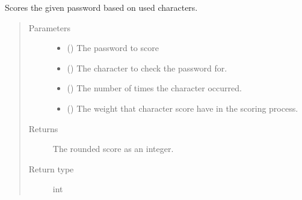 \documentclass[letterpaper,10pt,english]{sphinxmanual}
\begin{document}
\begin{fulllineitems}
\begin{fulllineitems}
\end{fulllineitems}


\begin{fulllineitems}
\label{\detokenize{EntroPass:EntroPass.pwd_score.Pwd_score.score_pwd_chars}}
\sphinxAtStartPar
Scores the given password based on used characters.
\begin{quote}\begin{description}
\item[{Parameters}] \leavevmode\begin{itemize}
\item {} 
\sphinxAtStartPar
{} () \textendash{} The password to score

\item {} 
\sphinxAtStartPar
{} () \textendash{} The character to check the password for.

\item {} 
\sphinxAtStartPar
{} () \textendash{} The number of times the character occurred.

\item {} 
\sphinxAtStartPar
{} (\sphinxstyleliteralemphasis{\sphinxupquote{, }}) \textendash{} The weight that character score have in the scoring process.

\end{itemize}

\item[{Returns}] \leavevmode
\sphinxAtStartPar
The rounded score as an integer.

\item[{Return type}] \leavevmode
\sphinxAtStartPar
int

\end{description}\end{quote}


\end{fulllineitems}
\end{fulllineitems}
\end{document}
